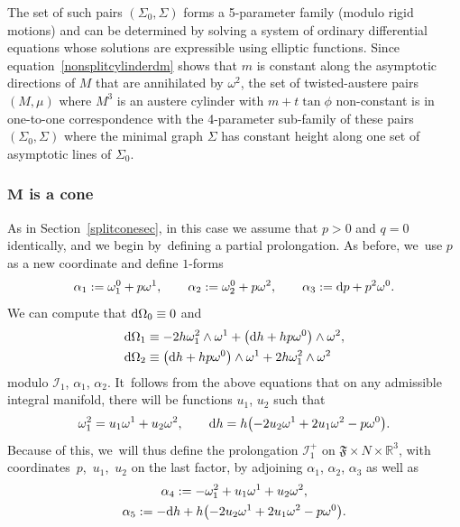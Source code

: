 \documentclass[pdftex]{sigma}
\def\R{\mathbb{R}}
\def\F{\mathfrak{F}}
\def\calI{\mathcal{I}}
\def\w{\omega}
\numberwithin{equation}{section}
\begin{document}
The set of such pairs $(\Sigma_0,\Sigma)$ forms a 5-parameter family (modulo rigid motions) and can be determined by solving a system of ordinary differential equations whose solutions are expressible using elliptic functions. Since equation~\eqref{nonsplitcylinderdm} shows that $m$ is constant along the asymptotic directions of $M$ that are annihilated by $\w^2$, the set of twisted-austere pairs $(M,\mu)$ where $M^3$ is an austere cylinder with $m+t\tan \phi$ non-constant is in one-to-one correspondence with the 4-parameter sub-family of these pairs $(\Sigma_0,\Sigma)$ where the minimal graph $\Sigma$ has constant height along one set of asymptotic lines of $\Sigma_0$.

\subsubsection[M is a cone]{$\boldsymbol M$ is a cone}

As in Section~\ref{splitconesec}, in this case we assume that $p > 0$ and $q=0$ identically, and we begin by~defining a partial prolongation. As before, we~use $p$ as a new coordinate and define $1$-forms
\begin{gather*} %
\alpha_1 := \w^0_1 + p \w^1, \qquad
\alpha_2 := \w^0_2 + p\w^2, \qquad
\alpha_3:={\rm d}p + p^2 \w^0.
\end{gather*}
We can compute that ${\rm d} \Omega_0\equiv 0$ and
\begin{align*}
{\rm d} \Omega_1 &\equiv -2h \w^2_1 \wedge \w^1 + \big({\rm d}h +hp \w^0\big) \wedge \w^2,\\
{\rm d} \Omega_2 &\equiv \big({\rm d}h+hp \w^0\big) \wedge \w^1 + 2h\w^2_1 \wedge \w^2
\end{align*}
modulo $\calI_1$, $\alpha_1$, $\alpha_2$. It~follows from the above equations that on any admissible integral manifold, there will be functions $u_1$, $u_2$ such that
\begin{gather*}
\w^2_1 = u_1 \w^1 + u_2 \w^2, \qquad
{\rm d}h = h\big({-}2u_2 \w^1 + 2u_1 \w^2 -p\w^0\big).
\end{gather*}
Because of this, we~will thus define the prolongation $\calI^+_1$ on $\F \times N \times \R^3$, with coordinates~$p$,~$u_1$,~$u_2$ on the last factor, by adjoining $\alpha_1$, $\alpha_2$, $\alpha_3$ as well as
\begin{gather*}
\alpha_4 := -\w^2_1 + u_1\w^1 + u_2 \w^2,
\\
\alpha_5 := -{\rm d}h + h\big({-} 2u_2 \w^1+2u_1 \w^2 -p\w^0\big).
\end{gather*}
\end{document}
